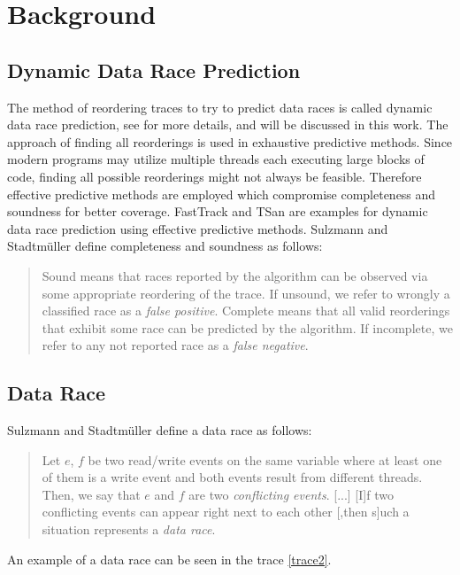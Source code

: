 \documentclass[12pt]{article}
\begin{document}
	\section{Background}\label{background-sec}
		\subsection{Dynamic Data Race Prediction}
		The method of reordering traces to try to predict data races is called dynamic data race prediction, see \cite[p. 2]{sulzmann2} for more details, and will be discussed in this work. The approach of finding all reorderings is used in exhaustive predictive methods. Since modern programs may utilize multiple threads each executing large blocks of code, finding all possible reorderings might not always be feasible. Therefore effective predictive methods are employed which compromise completeness and soundness for better coverage. FastTrack and TSan are examples for dynamic data race prediction using effective predictive methods. Sulzmann and Stadtm\"uller \cite[p. 2]{sulzmann} define completeness and soundness as follows:
		\begin{quote}
			Sound means that races reported by the algorithm can be observed via some appropriate reordering of the trace. If unsound, we refer to wrongly a classiﬁed race as a \textit{false positive}. Complete means that all valid reorderings that exhibit some race can be predicted by the algorithm. If incomplete, we refer to any not reported race as a \textit{false negative}.
		\end{quote}
		\subsection{Data Race}
		Sulzmann and Stadtm\"uller \cite[p. 1]{sulzmann} define a data race as follows: 
		\begin{quote}
			Let $e$, $f$ be two read/write events on the same variable where at least one of them is a write event and both events result from different threads. Then, we say that $e$ and $f$ are two \textit{conflicting events}. [...] [I]f two conflicting events can appear right next to each other [,then s]uch a situation represents a \textit{data race}.
		\end{quote}
		An example of a data race can be seen in the trace \ref{trace2}.
\end{document}
